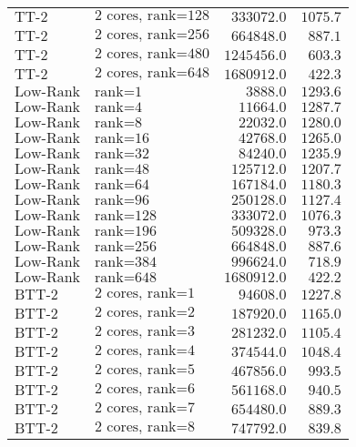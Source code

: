 \begin{longtable}{llrr}
$\text{TT-2}$ & $\text{2 cores, rank=128}$ & $333072.0$ & $1075.7$\\
$\text{TT-2}$ & $\text{2 cores, rank=256}$ & $664848.0$ & $887.1$\\
$\text{TT-2}$ & $\text{2 cores, rank=480}$ & $1245456.0$ & $603.3$\\
$\text{TT-2}$ & $\text{2 cores, rank=648}$ & $1680912.0$ & $422.3$\\
$\text{Low-Rank}$ & $\text{rank=1}$ & $3888.0$ & $1293.6$\\
$\text{Low-Rank}$ & $\text{rank=4}$ & $11664.0$ & $1287.7$\\
$\text{Low-Rank}$ & $\text{rank=8}$ & $22032.0$ & $1280.0$\\
$\text{Low-Rank}$ & $\text{rank=16}$ & $42768.0$ & $1265.0$\\
$\text{Low-Rank}$ & $\text{rank=32}$ & $84240.0$ & $1235.9$\\
$\text{Low-Rank}$ & $\text{rank=48}$ & $125712.0$ & $1207.7$\\
$\text{Low-Rank}$ & $\text{rank=64}$ & $167184.0$ & $1180.3$\\
$\text{Low-Rank}$ & $\text{rank=96}$ & $250128.0$ & $1127.4$\\
$\text{Low-Rank}$ & $\text{rank=128}$ & $333072.0$ & $1076.3$\\
$\text{Low-Rank}$ & $\text{rank=196}$ & $509328.0$ & $973.3$\\
$\text{Low-Rank}$ & $\text{rank=256}$ & $664848.0$ & $887.6$\\
$\text{Low-Rank}$ & $\text{rank=384}$ & $996624.0$ & $718.9$\\
$\text{Low-Rank}$ & $\text{rank=648}$ & $1680912.0$ & $422.2$\\
$\text{BTT-2}$ & $\text{2 cores, rank=1}$ & $94608.0$ & $1227.8$\\
$\text{BTT-2}$ & $\text{2 cores, rank=2}$ & $187920.0$ & $1165.0$\\
$\text{BTT-2}$ & $\text{2 cores, rank=3}$ & $281232.0$ & $1105.4$\\
$\text{BTT-2}$ & $\text{2 cores, rank=4}$ & $374544.0$ & $1048.4$\\
$\text{BTT-2}$ & $\text{2 cores, rank=5}$ & $467856.0$ & $993.5$\\
$\text{BTT-2}$ & $\text{2 cores, rank=6}$ & $561168.0$ & $940.5$\\
$\text{BTT-2}$ & $\text{2 cores, rank=7}$ & $654480.0$ & $889.3$\\
$\text{BTT-2}$ & $\text{2 cores, rank=8}$ & $747792.0$ & $839.8$\\

\end{longtable}
